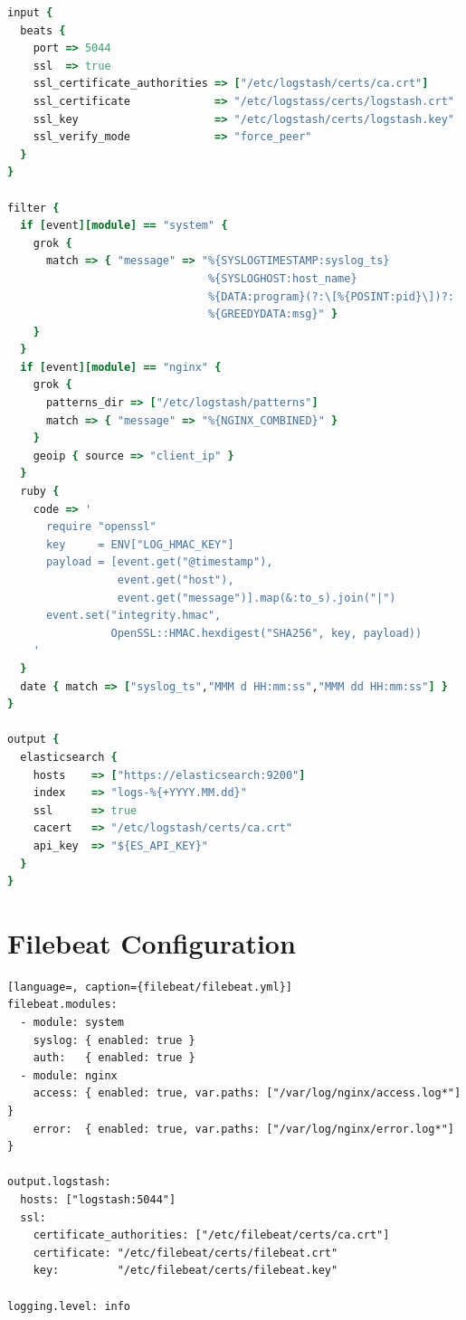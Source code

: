 \documentclass[12pt,a4paper]{report}
\begin{document}
\begin{lstlisting}[language=ruby, caption={logstash/pipeline/main.conf}]
input {
  beats {
    port => 5044
    ssl  => true
    ssl_certificate_authorities => ["/etc/logstash/certs/ca.crt"]
    ssl_certificate             => "/etc/logstass/certs/logstash.crt"
    ssl_key                     => "/etc/logstash/certs/logstash.key"
    ssl_verify_mode             => "force_peer"
  }
}

filter {
  if [event][module] == "system" {
    grok {
      match => { "message" => "%{SYSLOGTIMESTAMP:syslog_ts}
                               %{SYSLOGHOST:host_name}
                               %{DATA:program}(?:\[%{POSINT:pid}\])?:
                               %{GREEDYDATA:msg}" }
    }
  }
  if [event][module] == "nginx" {
    grok {
      patterns_dir => ["/etc/logstash/patterns"]
      match => { "message" => "%{NGINX_COMBINED}" }
    }
    geoip { source => "client_ip" }
  }
  ruby {
    code => '
      require "openssl"
      key     = ENV["LOG_HMAC_KEY"]
      payload = [event.get("@timestamp"),
                 event.get("host"),
                 event.get("message")].map(&:to_s).join("|")
      event.set("integrity.hmac",
                OpenSSL::HMAC.hexdigest("SHA256", key, payload))
    '
  }
  date { match => ["syslog_ts","MMM d HH:mm:ss","MMM dd HH:mm:ss"] }
}

output {
  elasticsearch {
    hosts    => ["https://elasticsearch:9200"]
    index    => "logs-%{+YYYY.MM.dd}"
    ssl      => true
    cacert   => "/etc/logstash/certs/ca.crt"
    api_key  => "${ES_API_KEY}"
  }
}
\end{lstlisting}

\chapter{Filebeat Configuration}

\begin{lstlisting}[language=, caption={filebeat/filebeat.yml}]
filebeat.modules:
  - module: system
    syslog: { enabled: true }
    auth:   { enabled: true }
  - module: nginx
    access: { enabled: true, var.paths: ["/var/log/nginx/access.log*"] }
    error:  { enabled: true, var.paths: ["/var/log/nginx/error.log*"] }

output.logstash:
  hosts: ["logstash:5044"]
  ssl:
    certificate_authorities: ["/etc/filebeat/certs/ca.crt"]
    certificate: "/etc/filebeat/certs/filebeat.crt"
    key:         "/etc/filebeat/certs/filebeat.key"

logging.level: info
\end{lstlisting}
\end{document}
